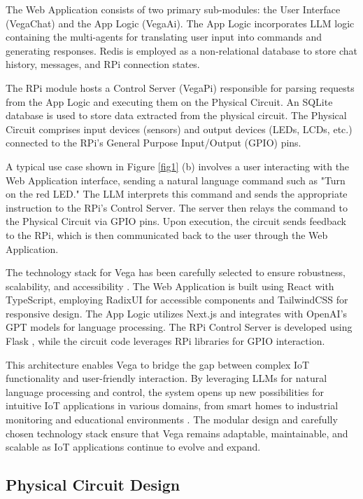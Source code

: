 \documentclass{ieeeaccess}
\begin{document}
The Web Application consists of two primary sub-modules: the User Interface (VegaChat) and the App Logic (VegaAi). The App Logic incorporates LLM logic containing the multi-agents for translating user input into commands and generating responses. Redis \cite{6106531} is employed as a non-relational database to store chat history, messages, and RPi connection states.

The RPi module hosts a Control Server (VegaPi) responsible for parsing requests from the App Logic and executing them on the Physical Circuit. An SQLite database \cite{sqlite} is used to store data extracted from the physical circuit. The Physical Circuit comprises input devices (sensors) and output devices (LEDs, LCDs, etc.) connected to the RPi's General Purpose Input/Output (GPIO) pins.

A typical use case shown in Figure  \ref{fig1} (b) involves a user interacting with the Web Application interface, sending a natural language command such as "Turn on the red LED." The LLM interprets this command and sends the appropriate instruction to the RPi's Control Server. The server then relays the command to the Physical Circuit via GPIO pins. Upon execution, the circuit sends feedback to the RPi, which is then communicated back to the user through the Web Application.

The technology stack for Vega has been carefully selected to ensure robustness, scalability, and accessibility \cite{math9040308}. The Web Application is built using React \cite{React2024} with TypeScript, employing RadixUI \cite{radix-ui} for accessible components and TailwindCSS \cite{tailwindcss} for responsive design. The App Logic utilizes Next.js \cite{NextJS} and integrates with OpenAI's GPT models \cite{OpenAI_GPT} for language processing. The RPi Control Server is developed using Flask \cite{Flask2024}, while the circuit code leverages RPi libraries for GPIO interaction.

This architecture enables Vega to bridge the gap between complex IoT functionality and user-friendly interaction. By leveraging LLMs for natural language processing and control, the system opens up new possibilities for intuitive IoT applications in various domains, from smart homes to industrial monitoring and educational environments \cite{8067944}. The modular design and carefully chosen technology stack ensure that Vega remains adaptable, maintainable, and scalable as IoT applications continue to evolve and expand.

\subsection{Physical Circuit Design}
\end{document}
